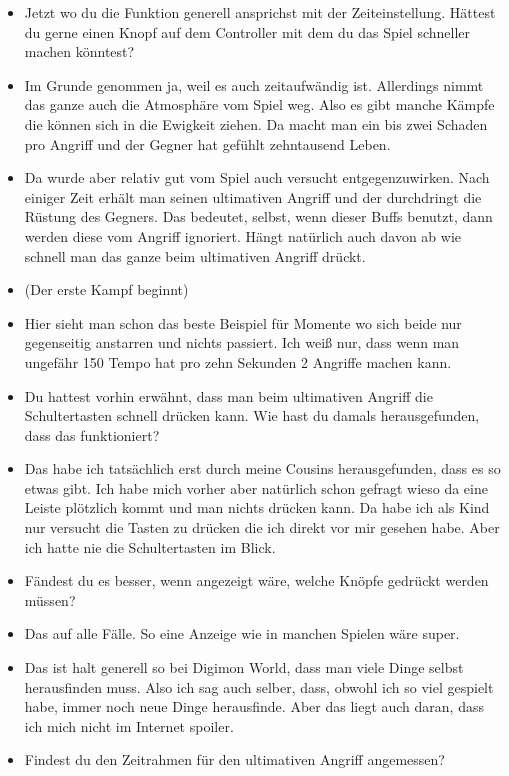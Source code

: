 {\begin{itemize}[]
    \item {} Jetzt wo du die Funktion generell ansprichst mit der Zeiteinstellung. Hättest du gerne einen Knopf auf dem Controller mit dem du das Spiel schneller machen könntest?
    \item {} Im Grunde genommen ja, weil es auch zeitaufwändig ist. Allerdings nimmt das ganze auch die Atmosphäre vom Spiel weg. Also es gibt manche Kämpfe die können sich in die Ewigkeit ziehen. Da macht man ein bis zwei Schaden pro Angriff und der Gegner hat gefühlt zehntausend Leben. 
    \item {} Da wurde aber relativ gut vom Spiel auch versucht entgegenzuwirken. Nach einiger Zeit erhält man seinen ultimativen Angriff und der durchdringt die Rüstung des Gegners. Das bedeutet, selbst, wenn dieser Buffs benutzt, dann werden diese vom Angriff ignoriert. Hängt natürlich auch davon ab wie schnell man das ganze beim ultimativen Angriff drückt. 
    \item {} (Der erste Kampf beginnt)
    \item {} Hier sieht man schon das beste Beispiel für Momente wo sich beide nur gegenseitig anstarren und nichts passiert. Ich weiß nur, dass wenn man ungefähr 150 Tempo hat pro zehn Sekunden 2 Angriffe machen kann. 
    \item {} Du hattest vorhin erwähnt, dass man beim ultimativen Angriff die Schultertasten schnell drücken kann. Wie hast du damals herausgefunden, dass das funktioniert?
    \item {} Das habe ich tatsächlich erst durch meine Cousins herausgefunden, dass es so etwas gibt. Ich habe mich vorher aber natürlich schon gefragt wieso da eine Leiste plötzlich kommt und man nichts drücken kann. Da habe ich als Kind nur versucht die Tasten zu drücken die ich direkt vor mir gesehen habe. Aber ich hatte nie die Schultertasten im Blick.
    \item {} Fändest du es besser, wenn angezeigt wäre, welche Knöpfe gedrückt werden müssen?
    \item {} Das auf alle Fälle. So eine Anzeige wie in manchen Spielen wäre super. 
    \item {} Das ist halt generell so bei Digimon World, dass man viele Dinge selbst herausfinden muss. Also ich sag auch selber, dass, obwohl ich so viel gespielt habe, immer noch neue Dinge herausfinde. Aber das liegt auch daran, dass ich mich nicht im Internet spoiler. 
    \item {} Findest du den Zeitrahmen für den ultimativen Angriff angemessen?

\end{itemize}}
